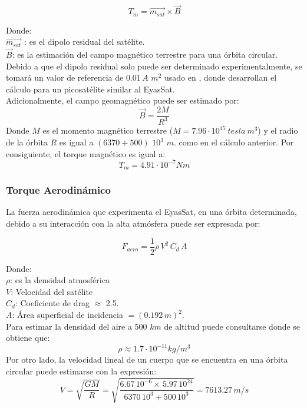 \begin{equation}
	T_m = \vec{m_{sat}}\times\vec{B}\label{eq:torque_mag}	
\end{equation}


\noindent Donde:\\
$\vec{m_{sat}}$ : es el dipolo residual del satélite.\\
$\vec{B}$: es la estimación del campo magnético terrestre para una órbita circular.\\

Debido a que el dipolo residual solo puede ser determinado experimentalmente, se tomará un valor de referencia de $0.01\,A $ $m^2$ usado en \cite{Giesselman2006}, donde desarrollan el cálculo  para un picosatélite similar al EyasSat.\\
Adicionalmente, el campo geomagnético puede ser estimado por:
\begin{equation}
	\vec{B} = \frac{2M}{R^3}\label{eq:campoMagnetico}
\end{equation}
Donde $M$ es el momento magnético terrestre ($M = 7.96\cdot10^{15}\:tesla\:m^3$) y el radio de la órbita $R$ es igual a $(6370 + 500)$ $10^3$ $m$. como en el cálculo anterior. Por consiguiente, el torque magnético es igual a:
$$T_m = 4.91\cdot10^{-7} Nm$$
	

\subsubsection{Torque Aerodinámico}
\hfill \break
La fuerza aerodinámica que experimenta el EyasSat, en una órbita determinada, debido a su interacción con la alta atmósfera puede ser expresada por:

\begin{equation}\label{eq:fuerza_aero}
	F_{aero} = \frac{1}{2}\rho\,V^2\,C_{d}\,A
\end{equation}

\noindent Donde:\\
$\rho$: es la densidad atmosférica\\
$V$: Velocidad del satélite \\
$C_d$: Coeficiente de drag $\approx$ 2.5.\\
$A$: Área superficial de incidencia $= \left(0.192\,m\right)^2$.\\

Para estimar la densidad del aire a 500 $km$ de altitud puede consultarse \cite{wertz2001mission} donde se obtiene que:
 $$\rho \approx 1.7\cdot10^{-11} kg/m^3$$
 Por otro lado, la velocidad lineal de un cuerpo que se encuentra en una órbita circular puede estimarse con la expresión:
 $$ V = \sqrt{\frac{GM}{R}} = \sqrt{\frac{6.67\,10^{-6}\times\,5.97\,10^{24}}{6370\,10^3 +500\,10^3}} =7613.27\,m/s $$

